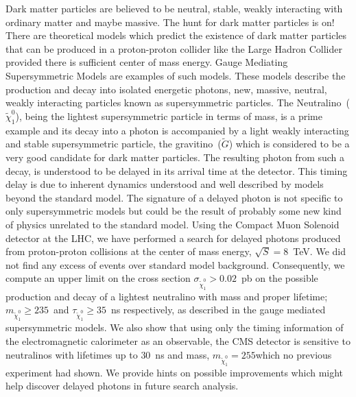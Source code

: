 
Dark matter particles are believed to be neutral, stable, weakly interacting with ordinary matter and maybe massive. The hunt for dark matter particles is on! There are theoretical models which predict the  existence of dark matter particles that can be produced in a proton-proton collider like the Large Hadron Collider provided there is sufficient center of mass energy. Gauge Mediating Supersymmetric Models are examples of such models. These models describe the production and decay into isolated energetic photons, new, massive, neutral, weakly interacting particles known as supersymmetric particles. The Neutralino~($\tilde{\chi}^{0}_{1}$), being the lightest supersymmetric particle in terms of mass, is a prime example and its decay into a photon is accompanied by a light weakly interacting and stable supersymmetric particle, the gravitino~($\tilde{G}$) which is considered to be a very good candidate for dark matter particles. The resulting photon from such a decay, is understood to be delayed in its arrival time at the detector. This timing delay is due to inherent dynamics understood and well described by models beyond the standard model. The signature of a delayed photon is not specific to only supersymmetric models but could be the result of probably some new kind of physics unrelated to the standard model. Using the Compact Muon Solenoid detector at the LHC, we have performed a search for delayed photons produced from proton-proton collisions at the center of mass energy, $\sqrt{S} = 8$~TeV. We did not find any excess of events over standard model background. Consequently, we compute an upper limit on the cross section $\sigma_{\tilde{\chi}^{0}_{1}} > 0.02$~pb on the possible production and decay of a lightest neutralino with  mass and proper lifetime; $m_{\tilde{\chi}^{0}_{1}} \geq 235$~\GeVcc and $\tau_{\tilde{\chi}^{0}_{1}} \ge 35$~ns respectively, as described in the gauge mediated supersymmetric models. We also show that using only the timing information of the electromagnetic calorimeter as an observable, the  CMS detector is sensitive to neutralinos with lifetimes up to $30$~ns and mass, $m_{\tilde{\chi}^{0}_{1}} = 255$\GeVcc which no previous experiment had shown. We provide hints on possible improvements which might help discover delayed photons in future search analysis.